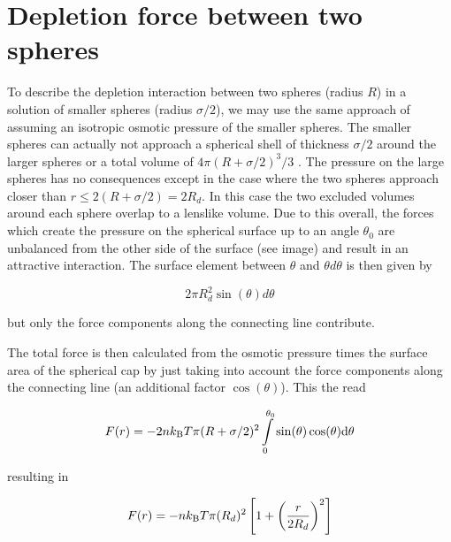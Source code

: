 \documentclass[letterpaper,10pt,english]{sphinxmanual}
\let\sphinxpxdimen\pdfpxdimen\else\newdimen\sphinxpxdimen
\begin{document}
\section{Depletion force between two spheres}
\label{\detokenize{notebooks/L12/1_depletion_forces:Depletion-force-between-two-spheres}}
\sphinxAtStartPar
To describe the depletion interaction between two spheres (radius \(R\)) in a solution of smaller spheres (radius \(σ/2\)), we may use the same approach of assuming an isotropic osmotic pressure of the smaller spheres. The smaller spheres can actually not approach a spherical shell of thickness \(σ/2\) around the larger spheres or a total volume of \(4π(R+σ/2)^3/3\) . The pressure on the large spheres has no consequences except in the case where the two spheres approach closer
than \(r≤2(R+σ/2)=2R_d\). In this case the two excluded volumes around each sphere overlap to a lens\sphinxhyphen{}like volume. Due to this overall, the forces which create the pressure on the spherical surface up to an angle \(θ_0\) are unbalanced from the other side of the surface (see image) and result in an attractive interaction. The surface element between \(\theta\) and \(\theta d\theta\) is then given by

\sphinxAtStartPar
\begin{equation}
2\pi R_{d}^2 \sin(\theta)d\theta
\end{equation}

\sphinxAtStartPar
but only the force components along the connecting line contribute.

\noindent\sphinxincludegraphics[width=544\sphinxpxdimen,height=300\sphinxpxdimen]{{depletion_spheres}.png}

\sphinxAtStartPar
The total force is then calculated from the osmotic pressure times the surface area of the spherical cap by just taking into account the force components along the connecting line (an additional factor \(\cos(\theta)\)). This the read

\sphinxAtStartPar
\begin{equation}
F(r)=-2nk_{\rm B}T\pi (R+\sigma/2)^2\int\limits_{0}^{\theta_{0}}\sin(\theta)\cos(\theta)\mathrm d\theta
\end{equation}

\sphinxAtStartPar
resulting in

\sphinxAtStartPar
\begin{equation}
F(r)=-nk_{\rm B}T\pi (R_{d})^2\left [ 1+\left ( \frac{r}{2R_{d}}\right )^2\right ]
\end{equation}
\end{document}
